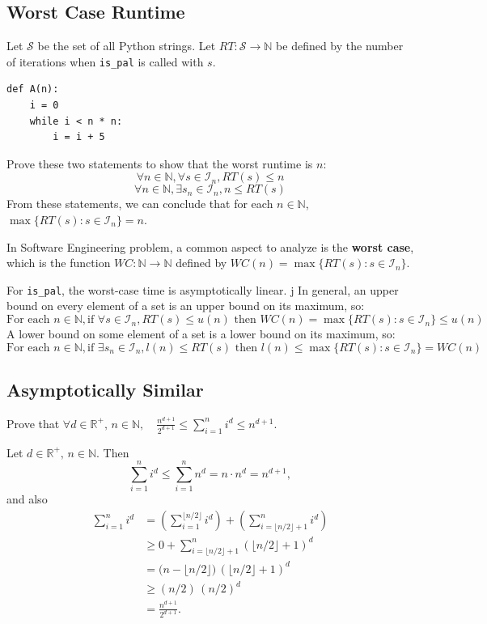 \documentclass{article}
\begin{document}
\subsection{Worst Case Runtime}
Let $\mathcal{S}$ be the set of all Python strings.
Let $RT:\mathcal{S}\rightarrow \mathbb{N}$ be defined by the number of iterations when \texttt{is\_pal} is called with $s$.

\begin{verbatim}
def A(n):
    i = 0
    while i < n * n:
        i = i + 5
\end{verbatim}
Prove these two statements to show that the worst runtime is $n$:
\[
\forall n\in\mathbb{N},\forall s\in\mathcal{I}_n,RT(s)\leq n
\]
\[
\forall n\in\mathbb{N},\exists s_n\in\mathcal{I}_n,n\leq RT(s)
\]
From these statements, we can conclude that for each $n\in\mathbb{N}$, $\max\{RT(s):s\in\mathcal{I}_n\}=n$.

In Software Engineering problem, a common aspect to analyze is the \textbf{worst case}, which is the function $WC:\mathbb{N}\rightarrow\mathbb{N}$ defined by $WC(n)=\max\{RT(s):s\in\mathcal{I}_n\}$.

For \texttt{is\_pal}, the worst-case time is asymptotically linear.
j
In general, an upper bound on every element of a set is an upper bound on its maximum, so:
\[
\text{For each } n\in\mathbb{N},\text{if }\forall s\in\mathcal{I}_n,RT(s)\leq u(n)\text{ then }WC(n)=\max\{RT(s):s\in\mathcal{I}_n\}\leq u(n)
\]
A lower bound on some element of a set is a lower bound on its maximum, so:
\[
\text{For each } n\in\mathbb{N},\text{if }\exists s_n\in\mathcal{I}_n,l(n)\leq RT(s)\text{ then }l(n)\leq\max\{RT(s):s\in\mathcal{I}_n\}=WC(n)
\]

\subsection{Asymptotically Similar}

Prove that $\forall d \in \mathbb{R}^+,\, n \in \mathbb{N}, \quad 
\frac{n^{d+1}}{2^{d+1}} \leq \sum_{i=1}^{n} i^d \leq n^{d+1}.$

Let $d \in \mathbb{R}^+,\, n \in \mathbb{N}$. Then
\[
\sum_{i=1}^{n} i^d\leq \sum_{i=1}^{n} n^d = n \cdot n^d = n^{d+1},
\]
and also
\begin{align*}
\sum_{i=1}^{n} i^d 
&= \left( \sum_{i=1}^{\lfloor n/2 \rfloor} i^d \right) 
  + \left( \sum_{i=\lfloor n/2 \rfloor + 1}^{n} i^d \right) \\
&\geq 0 + \sum_{i=\lfloor n/2 \rfloor + 1}^{n} \left(\lfloor n/2 \rfloor + 1\right)^d \\
&= \bigl(n - \lfloor n/2 \rfloor\bigr)\,\left(\lfloor n/2 \rfloor + 1\right)^d \\
&\geq (n/2)\,(n/2)^d \\
&= \frac{n^{d+1}}{2^{d+1}}.
\end{align*}
\end{document}

